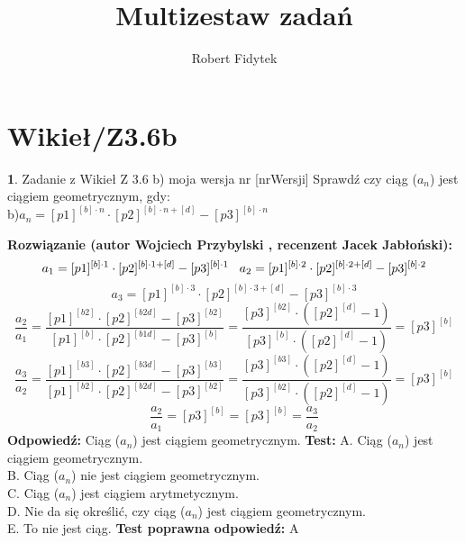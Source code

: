 \documentclass[12pt, a4paper]{article}
\title{Multizestaw zadań}
\author{Robert Fidytek}
\date{}
\theoremstyle{definition} %
\newtheorem{zad}{}
\newcommand{\kategoria}[1]{\section{#1}} %
\newcommand{\zadStart}[1]{\begin{zad}#1\newline} %
\newcommand{\zadStop}{\end{zad}}   %
\newcommand{\rozwStart}[2]{\noindent \textbf{Rozwiązanie (autor #1 , recenzent #2): }\newline} %
\newcommand{\rozwStop}{\newline}                                            %
\newcommand{\odpStart}{\noindent \textbf{Odpowiedź:}\newline}    %
\newcommand{\odpStop}{\newline}                                             %
\newcommand{\testStart}{\noindent \textbf{Test:}\newline} %
\newcommand{\testStop}{\newline} %
\newcommand{\kluczStart}{\noindent \textbf{Test poprawna odpowiedź:}\newline} %
\newcommand{\kluczStop}{\newline} %
\begin{document}
\maketitle


\kategoria{Wikieł/Z3.6b}
\zadStart{Zadanie z Wikieł Z 3.6 b) moja wersja nr [nrWersji]}
Sprawdź czy ciąg ($a_{n}$) jest ciągiem geometrycznym, gdy:\\
b)$a_{n}=[p1]^{[b]\cdot n}\cdot[p2]^{[b]\cdot n+[d]}-[p3]^{[b]\cdot n}$
\zadStop
\rozwStart{Wojciech Przybylski}{Jacek Jabłoński}
$$a_{1}=[p1]^{[b]\cdot 1}\cdot[p2]^{[b]\cdot 1+[d]}-[p3]^{[b]\cdot 1}\hspace{3mm}a_{2}=[p1]^{[b]\cdot 2}\cdot[p2]^{[b]\cdot 2+[d]}-[p3]^{[b]\cdot 2}$$
$$a_{3}=[p1]^{[b]\cdot 3}\cdot[p2]^{[b]\cdot 3+[d]}-[p3]^{[b]\cdot 3} $$
$$\frac{a_{2}}{a_{1}}=\frac{[p1]^{[b2]}\cdot [p2]^{[b2d]}-[p3]^{[b2]}}{[p1]^{[b]}\cdot [p2]^{[b1d]}-[p3]^{[b]}}=\frac{[p3]^{[b2]}\cdot([p2]^{[d]}-1)}{[p3]^{[b]}\cdot([p2]^{[d]}-1)}=[p3]^{[b]} $$
$$\frac{a_{3}}{a_{2}}=\frac{[p1]^{[b3]}\cdot [p2]^{[b3d]}-[p3]^{[b3]}}{[p1]^{[b2]}\cdot [p2]^{[b2d]}-[p3]^{[b2]}}=\frac{[p3]^{[b3]}\cdot([p2]^{[d]}-1)}{[p3]^{[b2]}\cdot([p2]^{[d]}-1)}=[p3]^{[b]} $$
$$\frac{a_{2}}{a_{1}}=[p3]^{[b]}=[p3]^{[b]}=\frac{a_{3}}{a_{2}}$$
\rozwStop
\odpStart
Ciąg ($a_{n}$) jest ciągiem geometrycznym.
\odpStop
\testStart
A. Ciąg ($a_{n}$) jest ciągiem geometrycznym.\\
B. Ciąg ($a_{n}$) nie jest ciągiem geometrycznym.\\
C. Ciąg ($a_{n}$) jest ciągiem arytmetycznym.\\
D. Nie da się określić, czy ciąg ($a_{n}$) jest ciągiem geometrycznym.\\
E. To nie jest ciąg.
\testStop
\kluczStart
A
\kluczStop
\end{document}
